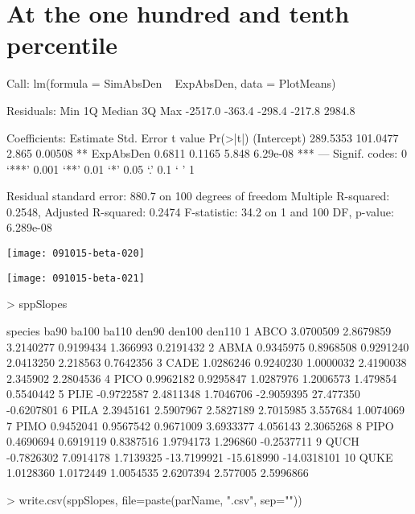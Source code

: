 \documentclass{article}
\begin{document}
\section{At the one hundred and tenth percentile}
\begin{Schunk}
\begin{Soutput}
Call:
lm(formula = SimAbsDen ~ ExpAbsDen, data = PlotMeans)

Residuals:
    Min      1Q  Median      3Q     Max 
-2517.0  -363.4  -298.4  -217.8  2984.8 

Coefficients:
            Estimate Std. Error t value Pr(>|t|)    
(Intercept) 289.5353   101.0477   2.865  0.00508 ** 
ExpAbsDen     0.6811     0.1165   5.848 6.29e-08 ***
---
Signif. codes:  0 ‘***’ 0.001 ‘**’ 0.01 ‘*’ 0.05 ‘.’ 0.1 ‘ ’ 1

Residual standard error: 880.7 on 100 degrees of freedom
Multiple R-squared:  0.2548,	Adjusted R-squared:  0.2474 
F-statistic:  34.2 on 1 and 100 DF,  p-value: 6.289e-08
\end{Soutput}
\end{Schunk}
\texttt{[image: 091015-beta-020]}

\texttt{[image: 091015-beta-021]}
\begin{Schunk}
\begin{Sinput}
>   sppSlopes
\end{Sinput}
\begin{Soutput}
   species       ba90     ba100     ba110       den90     den100      den110
1     ABCO  3.0700509 2.8679859 3.2140277   0.9199434   1.366993   0.2191432
2     ABMA  0.9345975 0.8968508 0.9291240   2.0413250   2.218563   0.7642356
3     CADE  1.0286246 0.9240230 1.0000032   2.4190038   2.345902   2.2804536
4     PICO  0.9962182 0.9295847 1.0287976   1.2006573   1.479854   0.5540442
5     PIJE -0.9722587 2.4811348 1.7046706  -2.9059395  27.477350  -0.6207801
6     PILA  2.3945161 2.5907967 2.5827189   2.7015985   3.557684   1.0074069
7     PIMO  0.9452041 0.9567542 0.9671009   3.6933377   4.056143   2.3065268
8     PIPO  0.4690694 0.6919119 0.8387516   1.9794173   1.296860  -0.2537711
9     QUCH -0.7826302 7.0914178 1.7139325 -13.7199921 -15.618990 -14.0318101
10    QUKE  1.0128360 1.0172449 1.0054535   2.6207394   2.577005   2.5996866
\end{Soutput}
\begin{Sinput}
>     write.csv(sppSlopes, file=paste(parName, ".csv", sep=""))
\end{Sinput}
\end{Schunk}
\end{document}
